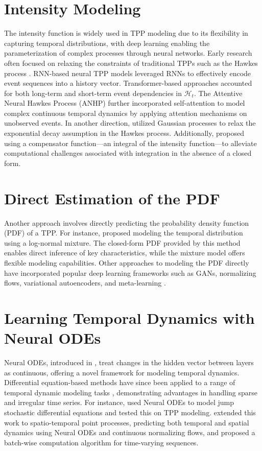 \section{Intensity Modeling} 
The intensity function is widely used in TPP modeling due to its flexibility in capturing temporal distributions, with deep learning enabling the parameterization of complex processes through neural networks. 
Early research often focused on relaxing the constraints of traditional TPPs such as the Hawkes process \cite{bib:hawkesOrigin, ISHAM1979335, bib:daley}. 
RNN-based neural TPP models \cite{bib:nhp, bib:RMTPP} leveraged RNNs to effectively encode event sequences into a history vector. 
Transformer-based approaches \cite{bib:THP, bib:sahp} accounted for both long-term and short-term event dependencies in $\mathcal{H}_t$. 
The Attentive Neural Hawkes Process (ANHP) \cite{bib:ANHP} further incorporated self-attention to model complex continuous temporal dynamics by applying attention mechanisms on unobserved events. 
In another direction, \cite{bib:nonparam} utilized Gaussian processes to relax the exponential decay assumption in the Hawkes process. 
Additionally, \cite{bib:fully_neural} proposed using a compensator function—an integral of the intensity function—to alleviate computational challenges associated with integration in the absence of a closed form.

\section{Direct Estimation of the PDF} 
Another approach involves directly predicting the probability density function (PDF) of a TPP. 
For instance, \cite{bib:ifl} proposed modeling the temporal distribution using a log-normal mixture. 
The closed-form PDF provided by this method enables direct inference of key characteristics, while the mixture model offers flexible modeling capabilities. 
Other approaches to modeling the PDF directly have incorporated popular deep learning frameworks such as GANs, normalizing flows, variational autoencoders, and meta-learning \cite{bib:exploring_generative, bib:MetaTPP}.

\section{Learning Temporal Dynamics with Neural ODEs} 
Neural ODEs, introduced in \cite{bib:node}, treat changes in the hidden vector between layers as continuous, offering a novel framework for modeling temporal dynamics. 
Differential equation-based methods have since been applied to a range of temporal dynamic modeling tasks \cite{bib:neuralTemporalWalk, bib:counterfactualCDE, bib:SDEGames}, demonstrating advantages in handling sparse and irregular time series. 
For instance, \cite{bib:NJSDE} used Neural ODEs to model jump stochastic differential equations and tested this on TPP modeling. 
\cite{bib:STPP} extended this work to spatio-temporal point processes, predicting both temporal and spatial dynamics using Neural ODEs and continuous normalizing flows, and proposed a batch-wise computation algorithm for time-varying sequences.
